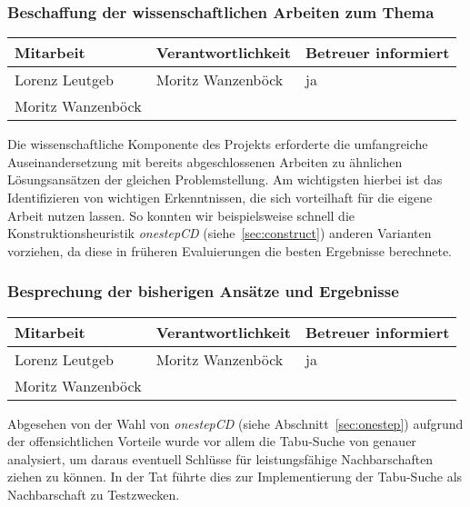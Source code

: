 \subsubsection{ Beschaffung der wissenschaftlichen Arbeiten zum Thema}

\begin{center}
\begin{tabular}{lll}
	Mitarbeit & Verantwortlichkeit & Betreuer informiert \\
	\hline
	Lorenz Leutgeb & Moritz Wanzenböck & ja \\
	Moritz Wanzenböck & & \\
\end{tabular}
\end{center}

Die wissenschaftliche Komponente des Projekts erforderte die umfangreiche Auseinandersetzung mit bereits abgeschlossenen Arbeiten zu ähnlichen Lösungsansätzen der gleichen Pro\-blem\-stel\-lung. Am wichtigsten hierbei ist das Identifizieren von wichtigen Erkenntnissen, die sich vorteilhaft für die eigene Arbeit nutzen lassen. So konnten wir beispielsweise schnell die Konstruktionsheuristik \emph{onestepCD} (siehe~\ref{sec:construct}) anderen Varianten vorziehen, da diese in früheren Evaluierungen die besten Ergebnisse berechnete.

\subsubsection{ Besprechung der bisherigen Ansätze und Ergebnisse}

\begin{center}
\begin{tabular}{lll}
	Mitarbeit & Verantwortlichkeit & Betreuer informiert \\
	\hline
	Lorenz Leutgeb & Moritz Wanzenböck & ja \\
	Moritz Wanzenböck & & \\
\end{tabular}
\end{center}

Abgesehen von der Wahl von \emph{onestepCD} (siehe Abschnitt~\ref{sec:onestep}) aufgrund der offensichtlichen Vorteile wurde vor allem die Tabu-Suche von \citet*{Noronha2006} genauer analysiert, um daraus eventuell Schlüsse für leistungsfähige Nachbarschaften ziehen zu können. In der Tat führte dies zur Implementierung der Tabu-Suche als Nachbarschaft zu Testzwecken. %

